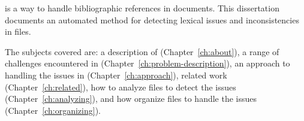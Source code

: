 {\bibtex} is a way to handle bibliographic references in
documents. This dissertation documents an automated method for
detecting lexical issues and inconsistencies in {\bibtex} files.

The subjects covered are: a description of {\bibtex}
(Chapter~\ref{ch:about}), a range of challenges encountered in
{\bibtex} (Chapter~\ref{ch:problem-description}), an approach to
handling the issues in {\bibtex} (Chapter~\ref{ch:approach}), related
work (Chapter~\ref{ch:related}), how to analyze {\bibtex} files to
detect the issues (Chapter~\ref{ch:analyzing}), and how organize
{\bibtex} files to handle the issues (Chapter~\ref{ch:organizing}).

